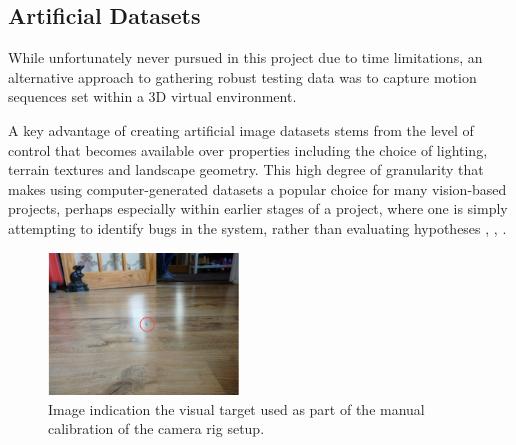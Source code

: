 %
%
%
%
%


\subsection{Artificial Datasets}

While unfortunately never pursued in this project due to time limitations, an alternative approach to gathering robust testing data was to capture motion sequences set within a 3D virtual environment. 

A key advantage of creating artificial image datasets stems from the level of control that becomes available over properties including the choice of lighting, terrain textures and landscape geometry. This high degree of granularity that makes using computer-generated datasets a popular choice for many vision-based projects, perhaps especially within earlier stages of a project, where one is simply attempting to identify bugs in the system, rather than evaluating hypotheses \cite{ucl-dataset}, \cite{baker-dataset}, \cite{mpi-dataset}.

 \begin{figure}
\vspace{-20pt}
  \begin{center}
    \includegraphics[width=0.45\textwidth]{images/cam_target.png}
  \end{center}
  \vspace{-10pt}
  \caption{Image indication the visual target used as part of the manual calibration of the camera rig setup.}
  \label{fig:target}
\vspace{-20pt}
\end{figure}

